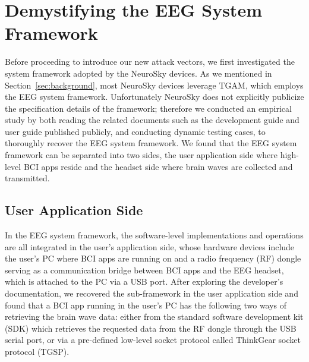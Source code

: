 \section{Demystifying the EEG System Framework}
\label{sec:framework}

Before proceeding to introduce our new attack vectors, we first investigated the system framework adopted by the NeuroSky devices. As we mentioned in Section~\ref{sec:background}, most NeuroSky devices leverage TGAM, which employs the EEG system framework. Unfortunately NeuroSky does not explicitly publicize the specification details of the framework; therefore we conducted an empirical study by both reading the related documents such as the development guide and user guide published publicly, and conducting dynamic testing cases, to thoroughly recover the EEG system framework. We found that the EEG system framework can be separated into two sides, the user application side where high-level BCI apps reside and the headset side where brain waves are collected and transmitted. 

\subsection{User Application Side}
In the EEG system framework, the software-level implementations and operations are all integrated in the user's application side, whose hardware devices include the user's PC where BCI apps are running on and a radio frequency (RF) dongle serving as a communication bridge between BCI apps and the EEG headset, which is attached to the PC via a USB port. After exploring the developer's documentation, we recovered the sub-framework in the user application side and found that a BCI app running in the user's PC has the following two ways of retrieving the brain wave data: either from the standard software development kit (SDK) which retrieves the requested data from the RF dongle through the USB serial port, or via a pre-defined low-level socket protocol called ThinkGear socket protocol (TGSP). 

